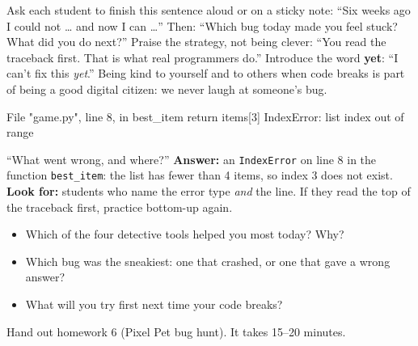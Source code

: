 \begin{safety}
Ask each student to finish this sentence aloud or on a sticky note: \enquote{Six weeks ago I could not \ldots{} and now I can \ldots}
Then: \enquote{Which bug today made you feel stuck? What did you do next?} Praise the strategy, not being clever:
\enquote{You read the traceback first. That is what real programmers do.} Introduce the word \textbf{yet}: \enquote{I can't fix this \emph{yet}.}
Being kind to yourself and to others when code breaks is part of being a good digital citizen: we never laugh at someone's bug.
\end{safety}

\begin{formativecheck}
\begin{outputcode}
  File "game.py", line 8, in best_item
    return items[3]
IndexError: list index out of range
\end{outputcode}
\enquote{What went wrong, and where?} \textbf{Answer:} an \texttt{IndexError} on line 8 in the function \texttt{best\_item}: the list has fewer than 4 items,
so index 3 does not exist. \textbf{Look for:} students who name the error type \emph{and} the line. If they read the top of the traceback first, practice bottom-up again.
\end{formativecheck}

\begin{reflection}
\begin{itemize}[leftmargin=1.2em]
  \item Which of the four detective tools helped you most today? Why?
  \item Which bug was the sneakiest: one that crashed, or one that gave a wrong answer?
  \item What will you try first next time your code breaks?
\end{itemize}
\end{reflection}
Hand out homework 6 (Pixel Pet bug hunt). It takes 15--20 minutes.

